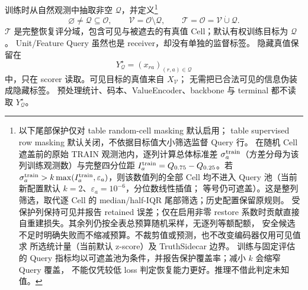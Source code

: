 \documentclass[11pt,UTF8,fontset=fandol]{ctexart}
\numberwithin{equation}{section}
\theoremstyle{definition}
\newcommand{\Oset}{\mathcal O}
\newcommand{\Vset}{\mathcal V}
\newcommand{\Qset}{\mathcal Q}
\newcommand{\TargetSet}{\mathcal T}
\begin{document}
训练时从自然观测中抽取非空 $\Qset$，并定义\footnote{以下尾部保护仅对 table random-cell masking 默认启用；
table supervised row masking 默认关闭，不依据目标值大小筛选监督 Query 行。
在随机 Cell 遮盖前的原始 TRAIN 观测池内，逐列计算总体标准差
$\sigma_a^{\rm train}$（方差分母为该列训练观测数）与完整四分位距
$I_a^{\rm train}=Q_{0.75}-Q_{0.25}$。若
$\sigma_a^{\rm train}>k\max(I_a^{\rm train},\varepsilon_a)$，则该数值列的全部 Cell
均不进入 Query 池（当前新配置默认 $k=2$、$\varepsilon_a=10^{-6}$，分位数线性插值；
等号仍可遮盖）。这是整列筛选，取代逐 Cell 的 median/half-IQR 尾部筛选；历史配置保留原规则。
受保护列保持可见并报告 retained 误差；仅在启用非零 restore 系数时贡献直接自重建损失。其余列仍按全表总预算随机采样，无逐列等额配额，
安全候选不足时明确失败而不缩减预算。不裁剪值或预测，也不改变编码器仅用可见值求
所选统计量（当前默认 z-score）及 TruthSidecar 边界。
训练与固定评估的 Query 指标均以可遮盖池为条件，并报告保护覆盖率；减小 $k$ 会缩窄 Query 覆盖，
不能仅凭较低 loss 判定恢复能力更好。推理不借此判定未知值。}
\begin{equation}
\varnothing\ne\Qset\subseteq\Oset,\qquad
\Vset=\Oset\setminus\Qset,\qquad
\boxed{\TargetSet=\Oset=\Vset\mathbin{\dot\cup}\Qset.}
\label{eq:P:training-targets}
\end{equation}
$\TargetSet$ 是完整恢复评分域，包含可见与被遮去的有真值 Cell；默认有权训练目标为 $\Qset$。
Unit/Feature Query 虽然也是 receiver，却没有单独的监督标签。
隐藏真值保留在
\begin{equation}
Y^\star_{\Qset}=(x_{ra})_{(r,a)\in\Qset}
\label{eq:P:truth-sidecar}
\end{equation}
中，只在 scorer 读取。可见目标的真值来自 $X_{\Vset}$；
无需把已合法可见的信息伪装成隐藏标签。
预处理统计、码本、ValueEncoder、backbone 与 terminal 都不读取 $Y^\star_{\Qset}$。
\end{document}
